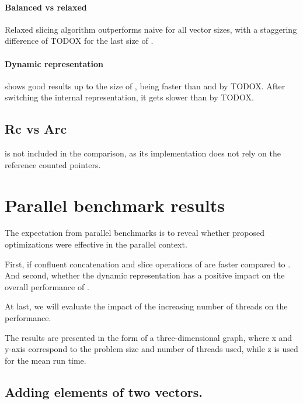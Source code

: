\paragraph{Balanced vs relaxed}
Relaxed slicing algorithm outperforms naive \rbvec{} for all vector sizes, with a staggering difference of TODOX for the last size of .

\paragraph{Dynamic representation}
\pvec{} shows good results up to the size of , being faster than \rrbvec{} and \imrsvec{} by TODOX. After switching the internal representation, it gets slower than \rrbvec{} by TODOX.

\subsection{Rc vs Arc}
\label{sec:perf-rc-vs-arc}
\stdvec{} is not included in the comparison, as its implementation does not rely on the reference counted pointers.

\section{Parallel benchmark results}
\label{sec:perf-par}

The expectation from parallel benchmarks is to reveal whether proposed optimizations were effective in the parallel context.

First, if confluent concatenation and slice operations of \rrbvec{} are faster compared to \rbvec{}. And second, whether the dynamic representation has a positive impact on the overall performance of \pvec{}.

At last, we will evaluate the impact of the increasing number of threads on the performance.

The results are presented in the form of a three-dimensional graph, where x and y-axis correspond to the problem size and number of threads used, while z is used for the mean run time.

\subsection{Adding elements of two vectors.}

